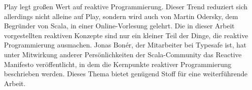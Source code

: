 Play legt großen Wert auf reaktive Programmierung.
Dieser Trend reduziert sich allerdings nicht alleine auf Play, sondern wird auch von Martin Odersky, dem Begründer von Scala, in einer Online-Vorlesung \cite[vgl.][]{principles_of_reactive_programming} gelehrt.
Die in dieser Arbeit vorgestellten reaktiven Konzepte sind nur ein kleiner Teil der Dinge, die reaktive Programmierung ausmachen.
Jonas Bonér, der Mitarbeiter bei Typesafe ist, hat unter Mitwirkung anderer Persönlichkeiten der Scala-Community das Reactive Manifesto \cite[vgl.][]{reactive_manifesto} veröffentlicht, in dem die Kernpunkte reaktiver Programmierung beschrieben werden.
Dieses Thema bietet genügend Stoff für eine weiterführende Arbeit.


